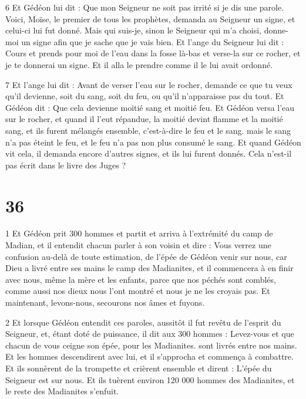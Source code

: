 \par 6 Et Gédéon lui dit : Que mon Seigneur ne soit pas irrité si je dis une parole. Voici, Moïse, le premier de tous les prophètes, demanda au Seigneur un signe, et celui-ci lui fut donné. Mais qui suis-je, sinon le Seigneur qui m'a choisi, donne-moi un signe afin que je sache que je vais bien. Et l'ange du Seigneur lui dit : Cours et prends pour moi de l'eau dans la fosse là-bas et verse-la sur ce rocher, et je te donnerai un signe. Et il alla le prendre comme il le lui avait ordonné.

\par 7 Et l'ange lui dit : Avant de verser l'eau sur le rocher, demande ce que tu veux qu'il devienne, soit du sang, soit du feu, ou qu'il n'apparaisse pas du tout. Et Gédéon dit : Que cela devienne moitié sang et moitié feu. Et Gédéon versa l'eau sur le rocher, et quand il l'eut répandue, la moitié devint flamme et la moitié sang, et ils furent mélangés ensemble, c'est-à-dire le feu et le sang. mais le sang n’a pas éteint le feu, et le feu n’a pas non plus consumé le sang. Et quand Gédéon vit cela, il demanda encore d'autres signes, et ils lui furent donnés. Cela n'est-il pas écrit dans le livre des Juges ?

\chapter{36}

\par 1 Et Gédéon prit 300 hommes et partit et arriva à l'extrémité du camp de Madian, et il entendit chacun parler à son voisin et dire : Vous verrez une confusion au-delà de toute estimation, de l'épée de Gédéon venir sur nous, car Dieu a livré entre ses mains le camp des Madianites, et il commencera à en finir avec nous, même la mère et les enfants, parce que nos péchés sont comblés, comme aussi nos dieux nous l'ont montré et nous je ne les croyais pas. Et maintenant, levons-nous, secourons nos âmes et fuyons.

\par 2 Et lorsque Gédéon entendit ces paroles, aussitôt il fut revêtu de l'esprit du Seigneur, et, étant doté de puissance, il dit aux 300 hommes : Levez-vous et que chacun de vous ceigne son épée, pour les Madianites. sont livrés entre nos mains. Et les hommes descendirent avec lui, et il s'approcha et commença à combattre. Et ils sonnèrent de la trompette et crièrent ensemble et dirent : L'épée du Seigneur est sur nous. Et ils tuèrent environ 120 000 hommes des Madianites, et le reste des Madianites s'enfuit.

